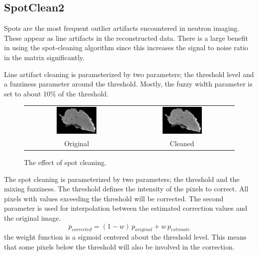 \documentclass[a4paper]{scrreprt}
\begin{document}
\subsection{SpotClean2}
Spots are the most frequent outlier artifacts encountered in neutron imaging. These appear as line artifacts in the reconstructed data. There is a large benefit in using the spot-cleaning algorithm since this increases the signal to
noise ratio in the matrix significantly.

Line artifact cleaning is parameterized by two parameters; the threshold level and a fuzziness parameter around the threshold. Mostly, the fuzzy width parameter is set to about 10\% of the threshold.
\begin{figure}[ht!]
\centering
\begin{tabular}{cc}
\includegraphics[width=0.4\textwidth]{figures/lineartifact_raw.png}&
\includegraphics[width=0.4\textwidth]{figures/lineartifact_clean.png}\\
Original & Cleaned
\end{tabular}
\caption{The effect of spot cleaning.}\label{fig_spotcleaning}
\end{figure}

The spot cleaning is parameterized by two parameters; the threshold and the mixing fuzziness. The threshold defines the intensity of the pixels to correct.
All pixels with values exceeding the threshold will be corrected. The second parameter is used for interpolation between the estimated correction values and the original image.
\[
p_{corrected}=(1-w)\,p_{original}+w\,p_{estimate}
\]
the weight function is a sigmoid centered about the threshold level. This means that some pixels below the threshold will also be involved in the correction.
\end{document}
